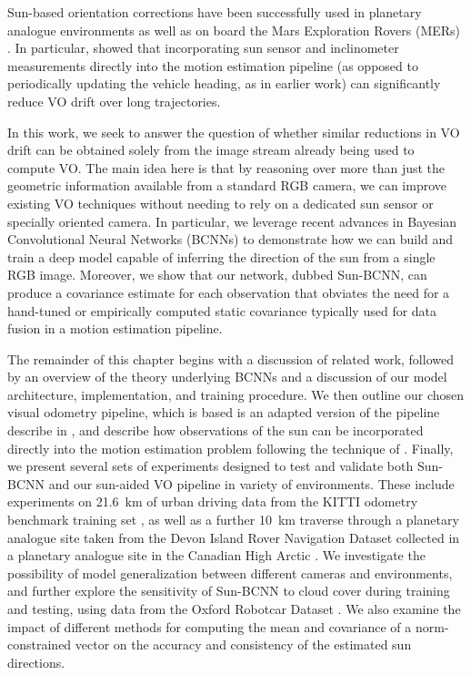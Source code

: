 Sun-based orientation corrections have been successfully used in planetary analogue environments \citep{Furgale2011-zu,Lambert2012-sn} as well as on board the Mars Exploration Rovers (MERs) \citep{Eisenman2002-cg,Maimone2007-tc}.
In particular, \citet{Lambert2012-sn} showed that incorporating sun sensor and inclinometer measurements directly into the motion estimation pipeline (as opposed to periodically updating the vehicle heading, as in earlier work) can significantly reduce VO drift over long trajectories.


In this work, we seek to answer the question of whether similar reductions in VO drift can be obtained solely from the image stream already being used to compute VO.
The main idea here is that by reasoning over more than just the geometric information available from a standard RGB camera, we can improve existing VO techniques without needing to rely on a dedicated sun sensor or specially oriented camera.
In particular, we leverage recent advances in Bayesian Convolutional Neural Networks (BCNNs) to demonstrate how we can build and train a deep model capable of inferring the direction of the sun from a single RGB image. 
Moreover, we show that our network, dubbed Sun-BCNN, can produce a covariance estimate for each observation that obviates the need for a hand-tuned or empirically computed static covariance typically used for data fusion in a motion estimation pipeline. 




The remainder of this chapter begins with a discussion of related work, followed by an overview of the theory underlying BCNNs and a discussion of our model architecture, implementation, and training procedure.
We then outline our chosen visual odometry pipeline, which is based is an adapted version of the pipeline describe in , and describe how observations of the sun can be incorporated directly into the motion estimation problem following the technique of \citet{Lambert2012-sn}.
Finally, we present several sets of experiments designed to test and validate both Sun-BCNN and our sun-aided VO pipeline in variety of environments.
These include experiments on 21.6~km of urban driving data from the KITTI odometry benchmark training set \citep{Geiger2013-ky}, as well as a further 10~km traverse through a planetary analogue site taken from the Devon Island Rover Navigation Dataset collected in a planetary analogue site in the Canadian High Arctic \citep{Furgale2012-kk}.
We investigate the possibility of model generalization between different cameras and environments, and further explore the sensitivity of Sun-BCNN to cloud cover during training and testing, using data from the Oxford Robotcar Dataset \citep{Maddern2016-ng}.
We also examine the impact of different methods for computing the mean and covariance of a norm-constrained vector on the accuracy and consistency of the estimated sun directions.

